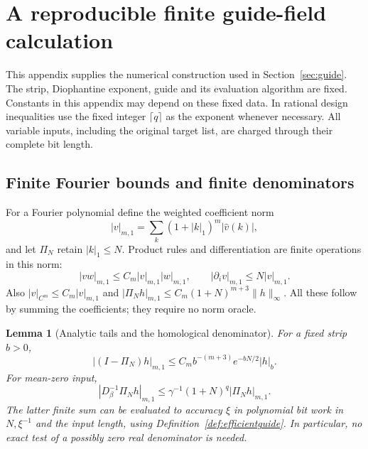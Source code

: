 \documentclass[11pt,a4paper]{amsart}
\newtheorem{lemma}[theorem]{Lemma}
\theoremstyle{definition}
\theoremstyle{remark}
\numberwithin{equation}{section}
\newcommand{\norm}[1]{\lVert #1\rVert}
\begin{document}
\section{A reproducible finite guide-field calculation}\label{app:finiteguide}

This appendix supplies the numerical construction used in Section~\ref{sec:guide}. The strip, Diophantine exponent, guide and its evaluation algorithm are fixed. Constants in this appendix may depend on these fixed data. In rational design inequalities use the fixed integer $\lceil q\rceil$ as the exponent whenever necessary. All variable inputs, including the original target list, are charged through their complete bit length.

\subsection{Finite Fourier bounds and finite denominators}
For a Fourier polynomial define the weighted coefficient norm
\[
 |v|_{m,1}=\sum_k(1+|k|_1)^m|\widehat v(k)|,
\]
and let $\Pi_N$ retain $|k|_1\le N$. Product rules and differentiation are finite operations in this norm:
\begin{equation}\label{eq:finiteFourierops}
 |vw|_{m,1}\le C_m|v|_{m,1}|w|_{m,1},\qquad
 |\partial_i v|_{m,1}\le N|v|_{m,1}.
\end{equation}
Also $|v|_{C^m}\le C_m|v|_{m,1}$ and
$|\Pi_N h|_{m,1}\le C_m(1+N)^{m+3}\norm h_\infty$.
All these follow by summing the coefficients; they require no norm oracle.

\begin{lemma}[Analytic tails and the homological denominator]\label{lem:guidefiniteops}
For a fixed strip $b>0$,
\begin{equation}\label{eq:analytictail}
 |(I-\Pi_N)h|_{m,1}
 \le C_m b^{-(m+3)}e^{-bN/2}|h|_b.
\end{equation}
For mean-zero input,
\[
 |D_\beta^{-1}\Pi_Nh|_{m,1}
 \le\gamma^{-1}(1+N)^q|\Pi_Nh|_{m,1}.
\]
The latter finite sum can be evaluated to accuracy $\xi$ in polynomial bit work in $N,\xi^{-1}$ and the input length, using Definition~\ref{def:efficientguide}. In particular, no exact test of a possibly zero real denominator is needed.
\end{lemma}
\end{document}
